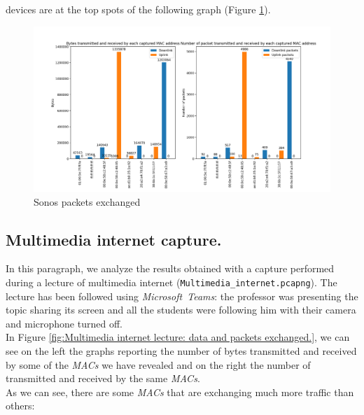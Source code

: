 devices are at the top spots of the following graph (Figure \ref{fig:Sonos_packets}).
\begin{figure}[h]
    \includegraphics[width=\textwidth]{Graphs/SONOS_bytes_packets.png}
    \caption{Sonos packets exchanged}
    \label{fig:Sonos_packets}
\end{figure}


\subsection{Multimedia internet capture.}
In this paragraph, we analyze the results obtained with a capture performed during a lecture of
multimedia internet (\texttt{Multimedia\_internet.pcapng}).
The lecture has been followed using \textit{Microsoft\ Teams}: the professor was presenting the
topic sharing its screen and all the students were following him with their camera and microphone turned off.\\
In Figure \ref{fig:Multimedia internet lecture: data and packets exchanged.}, we can see on the
left the graphs reporting the number of bytes transmitted and received by some of the \textit{MACs}
we have revealed and on the right the number of transmitted and received by the same \textit{MACs}.\\
As we can see, there are some \textit{MACs} that are exchanging much more traffic than others:

